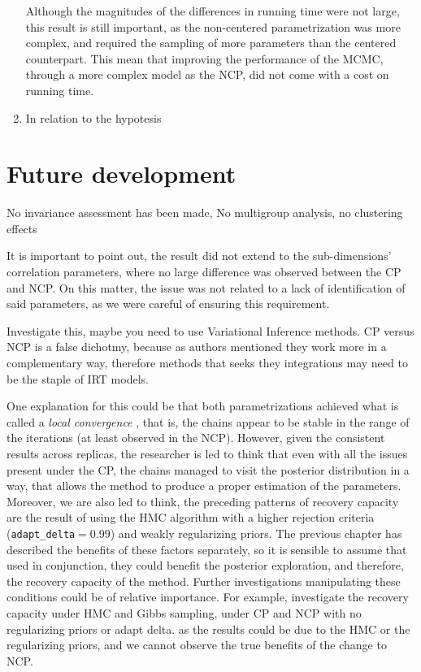\begin{enumerate}
	Although the magnitudes of the differences in running time were not large, this result is still important, as the non-centered parametrization was more complex, and required the sampling of more parameters than the centered counterpart. This mean that improving the performance of the MCMC, through a more complex model as the NCP, did not come with a cost on running time.
	\item In relation to the hypotesis
\end{enumerate}



\section{Future development}


No invariance assessment has been made, No multigroup analysis, no clustering effects

It is important to point out, the result did not extend to the sub-dimensions' correlation parameters, where no large difference was observed between the CP and NCP. On this matter, the issue was not related to a lack of identification of said parameters, as we were careful of ensuring this requirement.

Investigate this, maybe you need to use Variational Inference methods. CP versus NCP is a false dichotmy, because as authors mentioned they work more in a complementary way, therefore methods that seeks they integrations may need to be the staple of IRT models.

One explanation for this could be that both parametrizations achieved what is called a \textit{local convergence} \cite{Depaoli_2021}, that is, the chains appear to be stable in the range of the iterations (at least observed in the NCP). However, given the consistent results across replicas, the researcher is led to think that even with all the issues present under the CP, the chains managed to visit the posterior distribution in a way, that allows the method to produce a proper estimation of the parameters. Moreover, we are also led to think, the preceding patterns of recovery capacity are the result of using the HMC algorithm with a higher rejection criteria (\texttt{adapt\_delta}$=0.99$) and weakly regularizing priors. The previous chapter has described the benefits of these factors separately, so it is sensible to assume that used in conjunction, they could benefit the posterior exploration, and therefore, the recovery capacity of the method. Further investigations manipulating these conditions could be of relative importance. For example, investigate the recovery capacity under HMC and Gibbs sampling, under CP and NCP with no regularizing priors or adapt delta. as the results could be due to the HMC or the regularizing priors, and we cannot observe the true benefits of the change to NCP.


